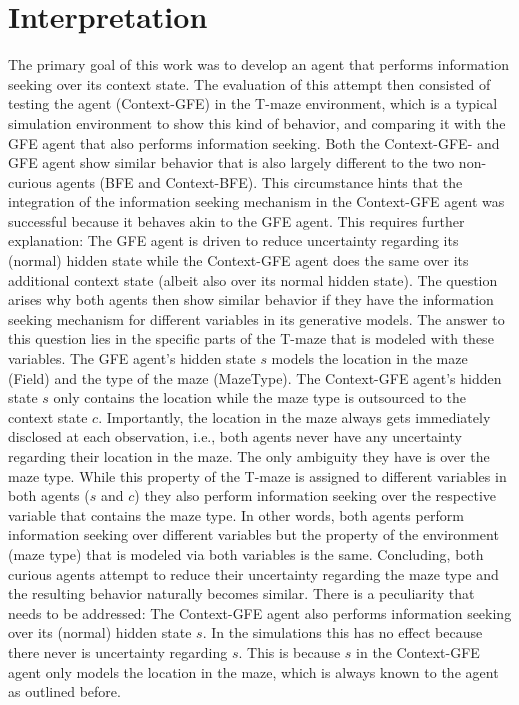 \section{Interpretation}

The primary goal of this work was to develop an agent that performs information seeking over its context state. The evaluation of this attempt then consisted of testing the agent (Context-GFE) in the T-maze environment, which is a typical simulation environment to show this kind of behavior, and comparing it with the GFE agent that also performs information seeking. Both the Context-GFE- and GFE agent show similar behavior that is also largely different to the two non-curious agents (BFE and Context-BFE). This circumstance hints that the integration of the information seeking mechanism in the Context-GFE agent was successful because it behaves akin to the GFE agent. This requires further explanation: The GFE agent is driven to reduce uncertainty regarding its (normal) hidden state while the Context-GFE agent does the same over its additional context state (albeit also over its normal hidden state). The question arises why both agents then show similar behavior if they have the information seeking mechanism for different variables in its generative models. The answer to this question lies in the specific parts of the T-maze that is modeled with these variables. The GFE agent's hidden state \(s\) models the location in the maze (Field) and the type of the maze (MazeType). The Context-GFE agent's hidden state \(s\) only contains the location while the maze type is outsourced to the context state \(c\). Importantly, the location in the maze always gets immediately disclosed at each observation, i.e., both agents never have any uncertainty regarding their location in the maze. The only ambiguity they have is over the maze type. While this property of the T-maze is assigned to different variables in both agents (\(s\) and \(c\)) they also perform information seeking over the respective variable that contains the maze type. In other words, both agents perform information seeking over different variables but the property of the environment (maze type) that is modeled via both variables is the same. Concluding, both curious agents attempt to reduce their uncertainty regarding the maze type and the resulting behavior naturally becomes similar. There is a peculiarity that needs to be addressed: The Context-GFE agent also performs information seeking over its (normal) hidden state \(s\). In the simulations this has no effect because there never is uncertainty regarding \(s\). This is because \(s\) in the Context-GFE agent only models the location in the maze, which is always known to the agent as outlined before.

